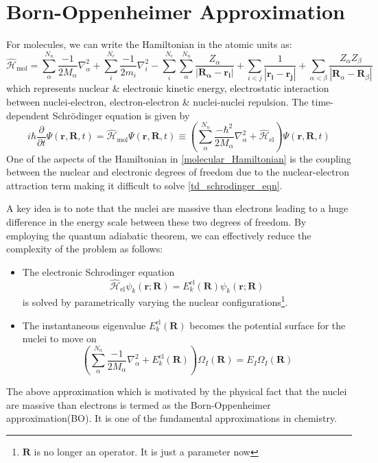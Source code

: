 \section{Born-Oppenheimer Approximation}

For molecules, we can write the Hamiltonian in the atomic units as:
\begin{equation}\label{molecular_Hamiltonian}
    \mathcal{\hat{H}}_{\text{mol}} = \sum_{\alpha}^{N_n}\frac{-1}{2M_\alpha}\nabla^2_\alpha + \sum_i^{N_e}\frac{-1}{2m_i}\nabla_i^2 - \sum_i^{N_e}\sum_\alpha^{N_n}\frac{Z_\alpha}{|\mathbf{R_\alpha}-\mathbf{r_i}|} + \sum_{i<j}\frac{1}{|\mathbf{r_i}-\mathbf{r_j}|} + \sum_{\alpha<\beta}\frac{Z_\alpha Z_\beta}{|\mathbf{R}_\alpha-\mathbf{R}_\beta|}
\end{equation}
which represents nuclear \& electronic kinetic energy, electrostatic interaction between nuclei-electron, electron-electron \& nuclei-nuclei repulsion. The time-dependent Schr{\"o}dinger equation is given by
\begin{equation}\label{td_mole_schrodinger}
    i\hbar\frac{\partial}{\partial t}\Psi(\mathbf{r},\mathbf{R},t) = \mathcal{\hat{H}}_{\text{mol}}\Psi(\mathbf{r},\mathbf{R},t) \equiv \left(\sum_\alpha^{N_n}\frac{-\hbar^2}{2M_\alpha}\nabla_\alpha^2 + \mathcal{\hat{H}}_{\text{el}}\right)\Psi(\mathbf{r},\mathbf{R},t)
\end{equation}
One of the aspects of the Hamiltonian in \eqref{molecular_Hamiltonian} is the coupling between the nuclear and electronic degrees of freedom due to the nuclear-electron attraction term making it difficult to solve \eqref{td_schrodinger_eqn}. 

A key idea is to note that the nuclei are massive than electrons leading to a huge difference in the energy scale between these two degrees of freedom. By employing the quantum adiabatic theorem\cite{griffiths_schroeter_2018,adi_appx_zwiebach}, we can effectively reduce the complexity of the problem as follows: 
\begin{itemize}
    \item The electronic Schrodinger equation 
    \begin{equation}
         \mathcal{\hat{H}}_{\text{el}}\psi_k(\mathbf{r};\mathbf{R}) = E^{\text{el}}_k(\mathbf{R})\psi_k(\mathbf{r};\mathbf{R})
    \end{equation}
    is solved by parametrically varying the nuclear configurations\footnote{$\mathbf{R}$ is no longer an operator. It is just a parameter now}. 
    \item The instantaneous eigenvalue $E^{\text{el}}_k(\mathbf{R})$ becomes the potential surface for the nuclei to move on
    \begin{equation}
        \left(\sum_{\alpha}^{N_n}\frac{-1}{2M_\alpha}\nabla^2_\alpha + E^{\text{el}}_k(\mathbf{R}) \right)\Omega_I(\mathbf{R}) = E_I\Omega_I(\mathbf{R})
    \end{equation}
\end{itemize}
The above approximation which is motivated by the physical fact that the nuclei are massive than electrons is termed as the Born-Oppenheimer approximation(BO). It is one of the fundamental approximations in chemistry. 

